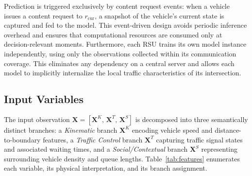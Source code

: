 \documentclass[journal]{IEEEtran}
\begin{document}
Prediction is triggered exclusively by content request events: when a vehicle issues a content request to $r_\text{cur}$, a snapshot of the vehicle's current state is captured and fed to the model.
This event-driven design avoids periodic inference overhead and ensures that computational resources are consumed only at decision-relevant moments.
Furthermore, each RSU trains its own model instance independently, using only the observations collected within its communication coverage.
This eliminates any dependency on a central server and allows each model to implicitly internalize the local traffic characteristics of its intersection.

\subsection{Input Variables}

The input observation $\mathbf{X} = [\mathbf{X}^K,\, \mathbf{X}^T,\, \mathbf{X}^S]$ is decomposed into three semantically distinct branches:
a \textit{Kinematic} branch $\mathbf{X}^K$ encoding vehicle speed and distance-to-boundary features,
a \textit{Traffic Control} branch $\mathbf{X}^T$ capturing traffic signal states and associated waiting times,
and a \textit{Social/Contextual} branch $\mathbf{X}^S$ representing surrounding vehicle density and queue lengths.
Table~\ref{tab:features} enumerates each variable, its physical interpretation, and its branch assignment.
\end{document}
